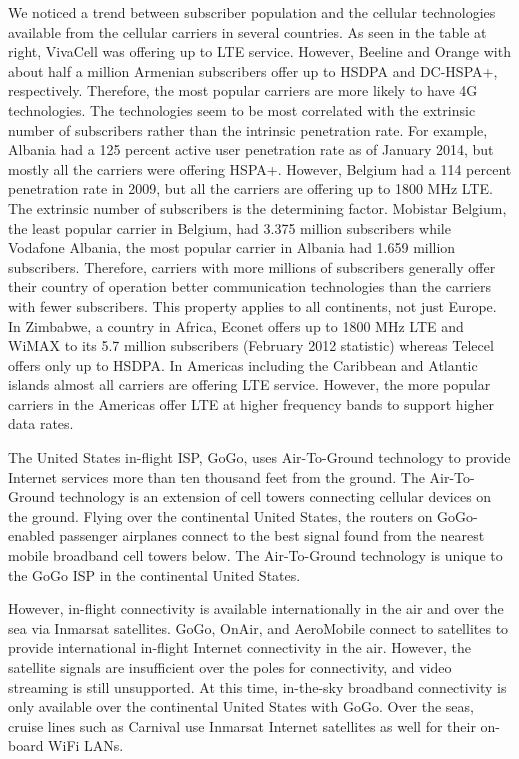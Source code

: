 \documentclass{sigcomm-alternate}
\begin{document}
We noticed a trend between subscriber population and the cellular technologies available from the cellular carriers in several countries. As seen in the table at right, VivaCell was offering up to LTE service. However, Beeline and Orange with about half a million Armenian subscribers offer up to HSDPA and DC-HSPA+, respectively. Therefore, the most popular carriers are more likely to have 4G technologies. The technologies seem to be most correlated with the extrinsic number of subscribers rather than the intrinsic penetration rate. For example, Albania had a 125 percent active user penetration rate as of January 2014, but mostly all the carriers were offering HSPA+. However, Belgium had a 114 percent penetration rate in 2009, but all the carriers are offering up to 1800 MHz LTE. The extrinsic number of subscribers is the determining factor. Mobistar Belgium, the least popular carrier in Belgium, had 3.375 million subscribers while Vodafone Albania, the most popular carrier in Albania had 1.659 million subscribers. Therefore, carriers with more millions of subscribers generally offer their country of operation better communication technologies than the carriers with fewer subscribers. This property applies to all continents, not just Europe. In Zimbabwe, a country in Africa, Econet offers up to 1800 MHz LTE and WiMAX to its 5.7 million subscribers (February 2012 statistic) whereas Telecel offers only up to HSDPA. In Americas including the Caribbean and Atlantic islands almost all carriers are offering LTE service. However, the more popular carriers in the Americas offer LTE at higher frequency bands to support higher data rates. 
        
The United States in-flight ISP, GoGo, uses Air-To-Ground technology to provide Internet services more than ten thousand feet from the ground. The Air-To-Ground technology is an extension of cell towers connecting cellular devices on the ground. Flying over the continental United States, the routers on GoGo-enabled passenger airplanes connect to the best signal found from the nearest mobile broadband cell towers below. The Air-To-Ground technology is unique to the GoGo ISP in the continental United States. 

However, in-flight connectivity is available internationally in the air and over the sea via Inmarsat satellites. GoGo, OnAir, and AeroMobile connect to satellites to provide international in-flight Internet connectivity in the air. However, the satellite signals are insufficient over the poles for connectivity, and video streaming is still unsupported. At this time, in-the-sky broadband connectivity is only available over the continental United States with GoGo. Over the seas, cruise lines such as Carnival use Inmarsat Internet satellites as well for their on-board WiFi LANs.
\end{document}
